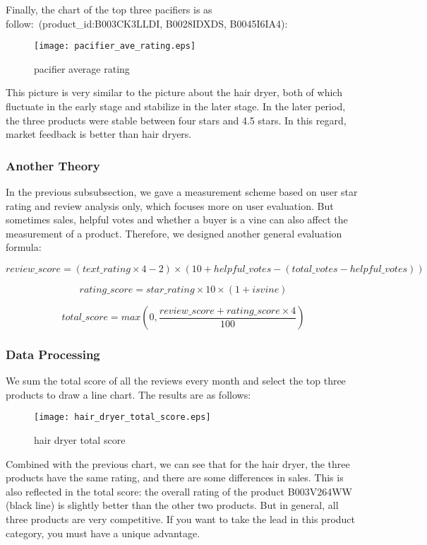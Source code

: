 \documentclass{mcmthesis}
\begin{document}
	Finally, the chart of the top three pacifiers is as follow:\ (product\_id:B003CK3LLDI, B0028IDXDS, B0045I6IA4):
	\begin{figure}[H]
		\small
		\centering
		\texttt{[image: pacifier\_ave\_rating.eps]}
		\caption{pacifier average rating} \label{fig:pacifier average rating}
	\end{figure}
	This picture is very similar to the picture about the hair dryer, both of which fluctuate in the early stage and stabilize in the later stage. In the later period, the three products were stable between four stars and 4.5 stars. In this regard, market feedback is better than hair dryers.
	
	
	\subsubsection{Another Theory}
	In the previous subsubsection, we gave a measurement scheme based on user star rating and review analysis only, which focuses more on user evaluation. But sometimes sales, helpful votes and whether a buyer is a vine can also affect the measurement of a product. Therefore, we designed another general evaluation formula:
	
	$$review\_score=(text\_rating\times4-2)\times(10+helpful\_votes-(total\_votes-helpful\_votes))$$
	
	$$rating\_score=star\_rating\times10\times(1+isvine)$$
	
	$$total\_score=max(0,\frac{review\_score+rating\_score\times4}{100})$$
	
	\subsubsection{Data Processing}
	We sum the total score of all the reviews every month and select the top three products to draw a line chart. The results are as follows:
	
	\begin{figure}[H]
		\small
		\centering
		\texttt{[image: hair\_dryer\_total\_score.eps]}
		\caption{hair dryer total score} \label{fig:hair dryer total score}
	\end{figure}
	
	Combined with the previous chart, we can see that for the hair dryer, the three products have the same rating, and there are some differences in sales. This is also reflected in the total score: the overall rating of the product B003V264WW (black line) is slightly better than the other two products. But in general, all three products are very competitive. If you want to take the lead in this product category, you must have a unique advantage.
	
\end{document}
